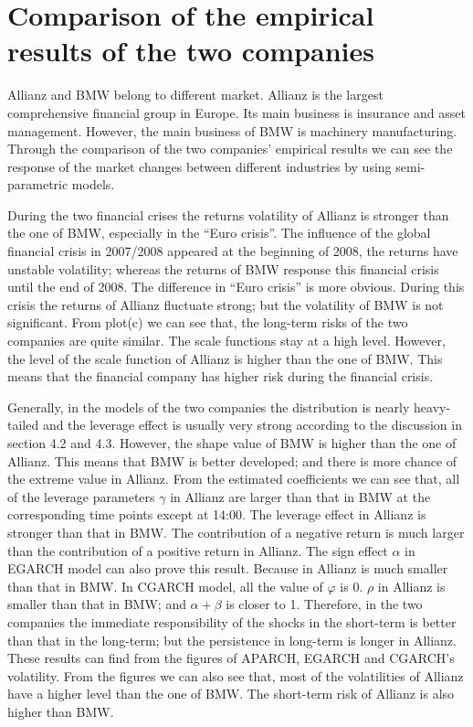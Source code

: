 \section{Comparison of the empirical results of the two companies}

Allianz and BMW belong to different market. Allianz is the largest comprehensive financial group in Europe. Its main business is insurance and asset management. However, the main business of BMW is machinery manufacturing. Through the comparison of the two companies’ empirical results we can see the response of the market changes between different industries by using semi-parametric models.

During the two financial crises the returns volatility of Allianz is stronger than the one of BMW, especially in the ``Euro crisis''. The influence of the global financial crisis in 2007/2008 appeared at the beginning of 2008, the returns have unstable volatility; whereas the returns of BMW response this financial crisis until the end of 2008. The difference in ``Euro crisis'' is more obvious. During this crisis the returns of Allianz fluctuate strong; but the volatility of BMW is not significant. From plot(c) we can see that, the long-term risks of the two companies are quite similar. The scale functions stay at a high level. However, the level of the scale function of Allianz is higher than the one of BMW. This means that the financial company has higher risk during the financial crisis.

Generally, in the models of the two companies the distribution is nearly heavy-tailed and the leverage effect is usually very strong according to the discussion in section 4.2 and 4.3. However, the shape value of BMW is higher than the one of Allianz. This means that BMW is better developed; and there is more chance of the extreme value in Allianz. From the estimated coefficients we can see that, all of the leverage parameters $\gamma$  in Allianz are larger than that in BMW at the corresponding time points except at 14:00. The leverage effect in Allianz is stronger than that in BMW. The contribution of a negative return is much larger than the contribution of a positive return in Allianz. The sign effect $\alpha$  in EGARCH model can also prove this result. Because  in Allianz is much smaller than that in BMW. In CGARCH model, all the value of $\varphi$  is 0.   $\rho$ in Allianz is smaller than that in BMW; and $\alpha + \beta$ is closer to 1. Therefore, in the two companies the immediate responsibility of the shocks in the short-term is better than that in the long-term; but the persistence in long-term is longer in Allianz. These results can find from the figures of APARCH, EGARCH and CGARCH’s volatility. From the figures we can also see that, most of the volatilities of Allianz have a higher level than the one of BMW. The short-term risk of Allianz is also higher than BMW.

